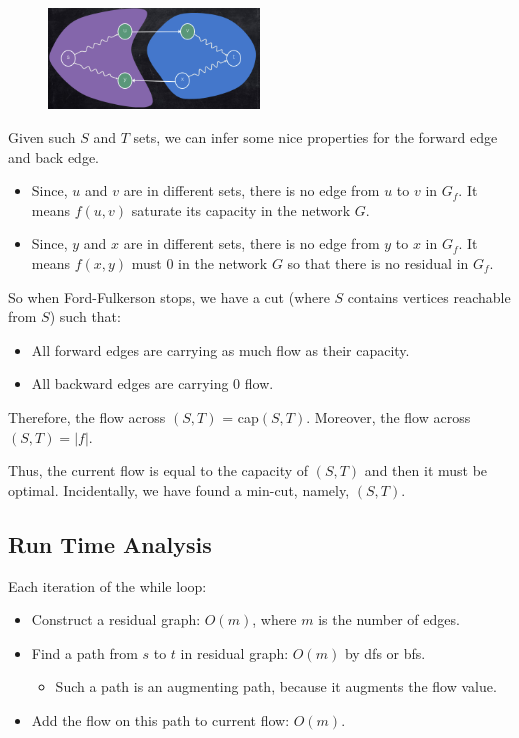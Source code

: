 \begin{figure}[H]
	\centering
	\includegraphics[width=0.5\textwidth]{fig/cut-2.png}
\end{figure}

Given such $S$ and $T$ sets, we can infer some nice properties for the forward edge and back edge.

\begin{itemize}
	\item Since, $u$ and $v$ are in different sets, there is no edge from $u$ to $v$ in $G_f$. It means $f(u, v)$ saturate its capacity in the network $G$.
	\item Since, $y$ and $x$ are in different sets, there is no edge from $y$ to $x$ in $G_f$. It means $f(x, y)$ must 0 in the network $G$ so that there is no residual in $G_f$.
\end{itemize}

So when Ford-Fulkerson stops, we have a cut (where $S$ contains vertices reachable from $S$) such that:
\begin{itemize}
	\item All forward edges are carrying as much flow as their capacity.
	\item All backward edges are carrying 0 flow.
\end{itemize}
Therefore, the flow across $(S, T)$ = cap$(S, T)$. Moreover, the flow across $(S, T) = |f|$.

Thus, the current flow is equal to the capacity of $(S, T)$ and then it must be optimal. Incidentally, we have found a min-cut, namely, $(S, T)$.

\subsection{Run Time Analysis}
Each iteration of the while loop:

\begin{itemize}
	\item Construct a residual graph: $O(m)$, where $m$ is the number of edges.
	\item Find a path from $s$ to $t$ in residual graph: $O(m)$ by dfs or bfs.
	\begin{itemize}
		\item Such a path is an augmenting path, because it augments the flow value.
	\end{itemize}
	\item Add the flow on this path to current flow: $O(m)$.
\end{itemize}

